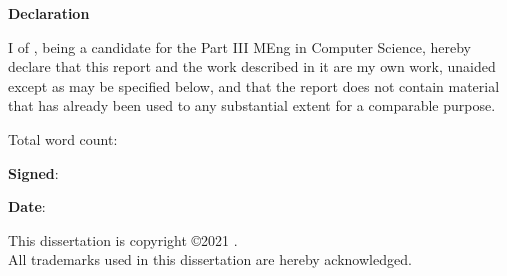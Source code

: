 \newpage
{\Huge \bf Declaration}

\vspace{24pt} 

I \authorname of \authorcollege, being a candidate for the Part III MEng
in Computer Science, hereby declare that this report and the
work described in it are my own work, unaided except as may be
specified below, and that the report does not contain material that
has already been used to any substantial extent for a comparable
purpose.

\vspace{24pt}
Total word count: \wordcount

\vspace{60pt}
\textbf{Signed}: 

\vspace{12pt}
\textbf{Date}:


\vfill

This dissertation is copyright \copyright 2021 \authorname. 
\\
All trademarks used in this dissertation are hereby acknowledged.



\newpage
\vspace*{\fill}
